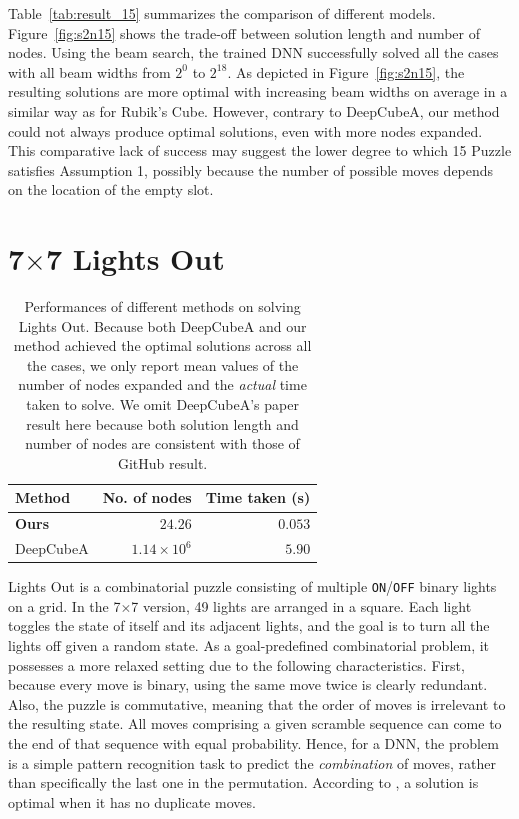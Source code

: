 \documentclass[nohyperref]{article}
\theoremstyle{plain}
\theoremstyle{definition}
\theoremstyle{remark}
\begin{document}
Table~\ref{tab:result_15} summarizes the comparison of different models.
Figure~\ref{fig:s2n15} shows the trade-off between solution length and number of nodes.
Using the beam search, the trained DNN successfully solved all the cases with all beam widths from $2^{0}$ to $2^{18}$.
As depicted in Figure~\ref{fig:s2n15}, the resulting solutions are more optimal with increasing beam widths on average in a similar way as for Rubik's Cube.
However, contrary to DeepCubeA, our method could not always produce optimal solutions, even with more nodes expanded.
This comparative lack of success may suggest the lower degree to which 15 Puzzle satisfies Assumption 1, possibly because the number of possible moves depends on the location of the empty slot.

\section{7$\times$7 Lights Out}\label{appendix:lightsout}

\begin{table}[tb]
    \centering
    \caption{
        Performances of different methods on solving Lights Out.
        Because both DeepCubeA and our method achieved the optimal solutions across all the cases, we only report mean values of the number of nodes expanded and the \textit{actual} time taken to solve.
        We omit DeepCubeA's paper result here because both solution length and number of nodes are consistent with those of GitHub result.
    }
    \vspace{1em}
    \begin{tabular}{l|r@{\hskip 1.5em}r}
        \toprule
        Method        & No. of nodes       & Time taken (s) \\
        \midrule[0.08em]
        \textbf{Ours} & {$\bm{24.26}$}     & {$\bm{0.053}$} \\
        DeepCubeA     & $1.14\times10^{6}$ & $5.90$         \\
        \bottomrule
    \end{tabular}
    \vspace{-0.5em}
    \label{tab:result_lightsout}
\end{table}

Lights Out is a combinatorial puzzle consisting of multiple \texttt{ON}/\texttt{OFF} binary lights on a grid. In the 7$\times$7 version, 49 lights are arranged in a square.
Each light toggles the state of itself and its adjacent lights, and the goal is to turn all the lights off given a random state.
As a goal-predefined combinatorial problem, it possesses a more relaxed setting due to the following characteristics.
First, because every move is binary, using the same move twice is clearly redundant.
Also, the puzzle is commutative, meaning that the order of moves is irrelevant to the resulting state.
All moves comprising a given scramble sequence can come to the end of that sequence with equal probability.
Hence, for a DNN, the problem is a simple pattern recognition task to predict the \textit{combination} of moves, rather than specifically the last one in the permutation.
According to \citet{agostinelli2019solving}, a solution is optimal when it has no duplicate moves.
\end{document}
